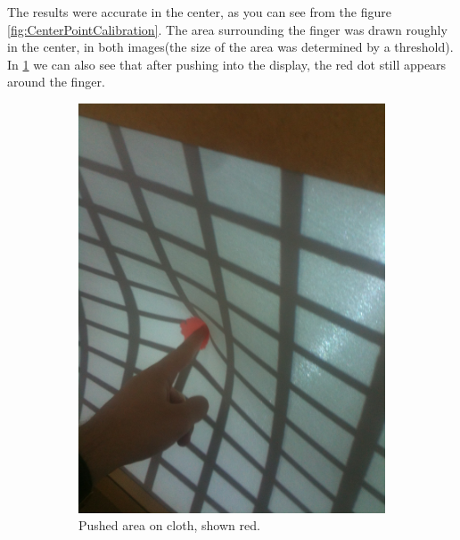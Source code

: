 \documentclass[]{article}
\begin{document}
The results were accurate in the center, as you can see from the figure \ref{fig:CenterPointCalibration}. The area surrounding the finger was drawn roughly in the center, in both images(the size of the area was determined by a threshold). In \ref{fig:RedCenterDotPhysical} we can also see that after pushing into the display, the red dot still appears around the finger.

\begin{figure}[!hbtp]
\centering
\begin{subfigure}{.5\textwidth}
  \centering
  \includegraphics[width=0.9\linewidth]{figures/RedCenterDotPhysical.JPG}
  \caption{Pushed area on cloth, shown red.}
  \label{fig:RedCenterDotPhysical}
\end{subfigure}%
\begin{subfigure}{.5\textwidth}
  \centering

\end{subfigure}
\end{figure}
\end{document}
